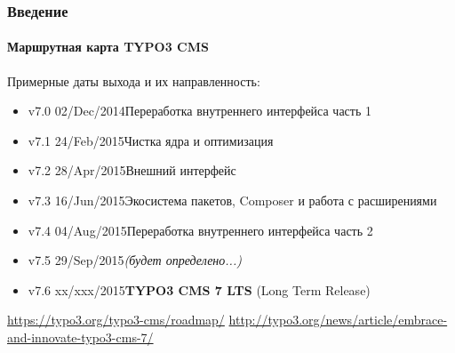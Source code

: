 \begin{frame}[fragile]
	\frametitle{Введение}
	\framesubtitle{Маршрутная карта TYPO3 CMS}

	Примерные даты выхода и их направленность:

	\begin{itemize}
		\item v7.0 \tabto{1.0cm}02/Dec/2014\tabto{3.4cm}Переработка внутреннего интерфейса часть 1
		\item v7.1 \tabto{1.0cm}24/Feb/2015\tabto{3.4cm}Чистка ядра и оптимизация
		\item v7.2 \tabto{1.0cm}28/Apr/2015\tabto{3.4cm}Внешний интерфейс
		\item v7.3 \tabto{1.0cm}16/Jun/2015\tabto{3.4cm}Экосистема пакетов, Composer\newline
                    \tabto{3.4cm}и работа с расширениями

		\item
			\begingroup
				\color{typo3orange}
					v7.4 \tabto{1.0cm}04/Aug/2015\tabto{3.4cm}Переработка внутреннего интерфейса часть 2
			\endgroup

		\item v7.5 \tabto{1.0cm}29/Sep/2015\tabto{3.4cm}\textit{(будет определено...)}
		\item v7.6 \tabto{1.0cm}xx/xxx/2015\tabto{3.4cm}\textbf{TYPO3 CMS 7 LTS} (Long Term Release)
	\end{itemize}

	\smaller
		\url{https://typo3.org/typo3-cms/roadmap/}\newline
		\url{http://typo3.org/news/article/embrace-and-innovate-typo3-cms-7/}
	\normalsize

\end{frame}

